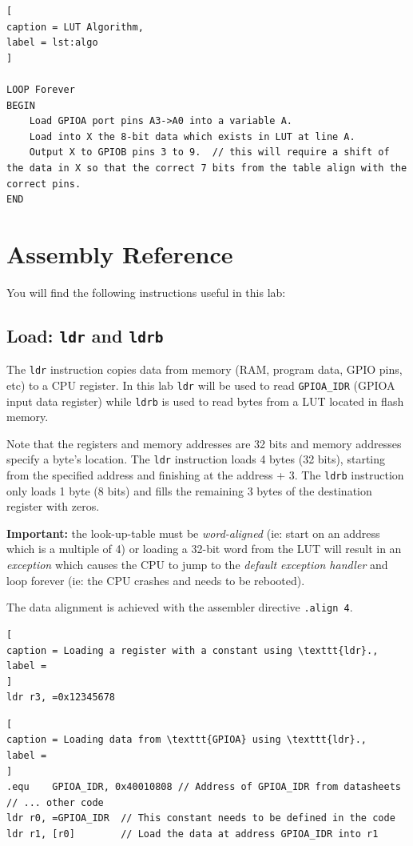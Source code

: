 \documentclass{UoNMCHA}
\numberwithin{equation}{section}
\begin{document}
\begin{lstlisting}[
caption = LUT Algorithm,
label = lst:algo
]

LOOP Forever
BEGIN
    Load GPIOA port pins A3->A0 into a variable A.
    Load into X the 8-bit data which exists in LUT at line A.
    Output X to GPIOB pins 3 to 9.  // this will require a shift of the data in X so that the correct 7 bits from the table align with the correct pins.
END
\end{lstlisting}

\section{Assembly Reference}\label{sec:asm}

You will find the following instructions useful in this lab:

\subsection{Load: \texttt{ldr} and \texttt{ldrb}}

The \texttt{ldr} instruction copies data from memory (RAM, program data, GPIO pins, etc) to a CPU register. In this lab \texttt{ldr} will be used to read \texttt{GPIOA\_IDR} (GPIOA input data register) while \texttt{ldrb} is used to read bytes from a LUT located in flash memory.

Note that the registers and memory addresses are 32 bits and memory addresses specify a byte's location. The \texttt{ldr} instruction loads 4 bytes (32 bits), starting from the specified address and finishing at the address + 3. The \texttt{ldrb} instruction only loads 1 byte (8 bits) and fills the remaining 3 bytes of the destination register with zeros.

\textbf{Important:} the look-up-table must be \textit{word-aligned} (ie: start on an address which is a multiple of 4) or loading a 32-bit word from the LUT will result in an \textit{exception} which causes the CPU to jump to the \textit{default exception handler} and loop forever (ie: the CPU crashes and needs to be rebooted).

The data alignment is achieved with the assembler directive \texttt{.align 4}.

\begin{lstlisting}[
caption = Loading a register with a constant using \texttt{ldr}.,
label = 
]
ldr r3, =0x12345678
\end{lstlisting}

\begin{lstlisting}[
caption = Loading data from \texttt{GPIOA} using \texttt{ldr}.,
label = 
]
.equ    GPIOA_IDR, 0x40010808 // Address of GPIOA_IDR from datasheets
// ... other code
ldr r0, =GPIOA_IDR  // This constant needs to be defined in the code
ldr r1, [r0]        // Load the data at address GPIOA_IDR into r1
\end{lstlisting}
\end{document}
